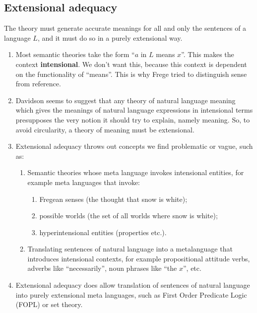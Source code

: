\subsection{Extensional adequacy}

\begin{definition}
The theory must generate accurate meanings for all and only the sentences of a language $L$, and it must do so in a purely extensional way.
\end{definition}

\begin{enumerate}[label=\roman*.]
  \item Most semantic theories take the form ``$a$ in $L$ means $x$''. This makes the context \textbf{intensional}. We don't want this, because this context is dependent on the functionality of ``means''. This is why Frege tried to distinguish sense from reference.
  \item Davidson seems to suggest that any theory of natural language meaning which gives the meanings of natural language expressions in intensional terms presupposes the very notion it should try to explain, namely meaning. So, to avoid circularity, a theory of meaning must be extensional.
  \item Extensional adequacy throws out concepts we find problematic or vague, such as:
  \begin{enumerate}
    \item Semantic theories whose meta language invokes intensional entities, for example meta languages that invoke:
    \begin{enumerate}[label=(\alph*)]
      \item Fregean senses (the thought that snow is white);
      \item possible worlds (the set of all worlds where snow is white);
      \item hyperintensional entities (properties etc.).
    \end{enumerate}
    \item Translating sentences of natural language into a metalanguage that introduces intensional contexts, for example propositional attitude verbs, adverbs like ``necessarily'', noun phrases like ``the $x$'', etc.
  \end{enumerate}
  \item Extensional adequacy does allow translation of sentences of natural language into purely extensional meta languages, such as First Order Predicate Logic (FOPL) or set theory.
\end{enumerate}


